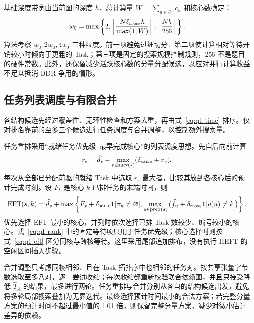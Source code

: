 基础深度带宽由当前图的深度 $h$、总计算量 $W=\sum_{u\in O_c}c_u$ 和核心数确定：
\begin{equation}
w_0=\max\left\{2,\left\lceil\frac{N\delta_{\rm cross}h}{\max(1,W)}\right\rceil,
\left\lceil\frac{Nh}{256}\right\rceil\right\}.
\label{eq:q1-band}
\end{equation}
算法考察 $w_0,2w_0,4w_0$ 三种粒度。前一项避免过细切分，第二项使计算相对等待开销较小时倾向于更粗的 Task；第三项是固定的搜索规模控制规则，256 不是题目的硬件常数。此外，还保留减少活跃核心数的分量分配候选，以应对并行计算收益不足以抵消 DDR 争用的情形。

\subsection{任务列表调度与有限合并}
各结构候选先经过覆盖性、无环性检查和方案去重，再由式~\eqref{eq:q1-time} 排序。仅对排名靠前的至多三个候选进行任务调度与合并调整，以控制额外搜索量。

任务重排采用“就绪任务优先级--最早完成核心”的列表调度思想\cite{Topcuoglu2002}。先自后向前计算
\begin{equation}
r_s=\widehat d_s+\max_{v\in\operatorname{succ}(s)}(\delta_{\rm same}+r_v).
\label{eq:q1-rank}
\end{equation}
每次从全部已分配前驱的就绪 Task 中选取 $r_s$ 最大者，比较其放到各核心后的预计完成时刻。设 $F_k$ 是核心 $k$ 已排任务的末端时间，则
\begin{equation}
\operatorname{EFT}(s,k)=\widehat d_s+
\max\left\{F_k+\delta_{\rm same}\mathbf1[\pi_k\ne\varnothing],
\max_{u\in\operatorname{pred}(s)}
\big(\widehat f_u+\delta_{\rm cross}\mathbf1[a(u)\ne k]\big)\right\}.
\label{eq:q1-eft}
\end{equation}
优先选择 EFT 最小的核心，并列时依次选择已排 Task 数较少、编号较小的核心。式~\eqref{eq:q1-rank} 中的固定等待项只用于任务优先级；核心选择时则按式~\eqref{eq:q1-eft} 区分同核与跨核等待。这里采用尾部追加排布，没有执行 HEFT 的空闲区间插入步骤。

合并调整只考虑同核相邻、且在 Task 拓扑序中也相邻的任务对。按共享张量字节数选取至多八对，逐一尝试收缩；每次收缩都重新校验联合依赖图，并且只接受降低 $\widehat T_A$ 的结果，最多进行两轮。任务重排与合并分别从各自的结构候选出发，避免将多轮局部搜索叠加为无界迭代。最终选择预计时间最小的合法方案；若完整分量方案的预计时间不超过最小值的 1.01 倍，则保留完整分量方案，减少对微小估计差异的依赖。

